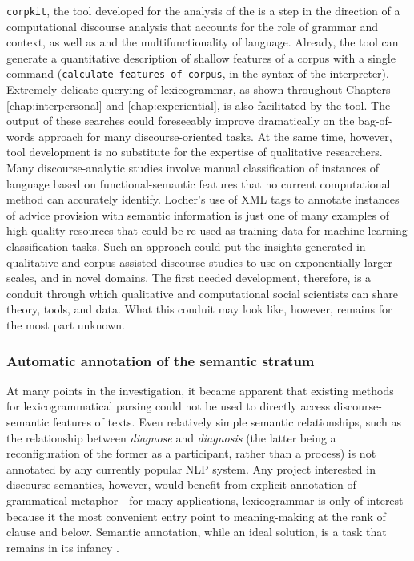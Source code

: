 \texttt{corpkit}, the tool developed for the analysis of the  is a step in the direction of a computational discourse analysis that accounts for the role of grammar and context, as well as and the multifunctionality of language. Already, the tool can generate a quantitative description of shallow features of a \gls{corpus} with a single command (\texttt{calculate features of corpus}, in the syntax of the interpreter). Extremely delicate querying of \gls{lexicogrammar}, as shown throughout Chapters \ref{chap:interpersonal} and \ref{chap:experiential}, is also facilitated by the tool. The output of these searches could foreseeably improve dramatically on the bag\hyp{}of\hyp{}words approach for many discourse\hyp{}oriented tasks. At the same time, however, tool development is no substitute for the expertise of qualitative researchers. Many discourse\hyp{}analytic studies involve manual classification of instances of language based on functional\hyp{}semantic features that no current computational method can accurately identify. Locher's \parencite*{locher2006advice} use of \gls{XML} tags to annotate instances of advice provision with semantic information is just one of many examples of high quality resources that could be re\hyp{}used as training data for machine learning classification tasks. Such an approach could put the insights generated in qualitative and corpus\hyp{}assisted discourse studies to use on exponentially larger scales, and in novel domains. The first needed development, therefore, is a conduit through which qualitative and computational social scientists can share theory, tools, and data. What this conduit may look like, however, remains for the most part unknown.

\subsubsection{Automatic annotation of the semantic stratum}

At many points in the investigation, it became apparent that existing methods for lexicogrammatical parsing could not be used to directly access \gls{discourse-semantic} features of texts. Even relatively simple semantic relationships, such as the relationship between \emph{diagnose} and \emph{diagnosis} (the latter being a reconfiguration of the former as a participant, rather than a process) is not annotated by any currently popular \gls{NLP} system. Any project interested in \glspl{discourse-semantic}, however, would benefit from explicit annotation of grammatical metaphor---for many applications, \gls{lexicogrammar} is only of interest because it the most convenient entry point to meaning\hyp{}making at the rank of clause and below. Semantic annotation, while an ideal solution, is a task that remains in its infancy \cite[see][]{rayson2004ucrel}.

